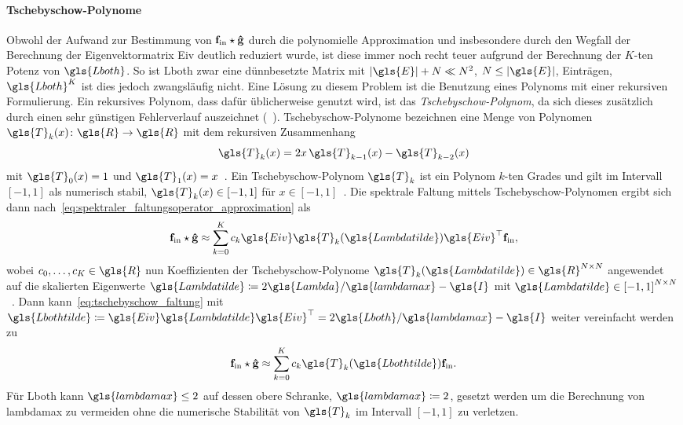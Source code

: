 \paragraph{Tschebyschow-Polynome}
\label{tschebyschow_polynome}

Obwohl der Aufwand zur Bestimmung von $\mathbf{f}_{\mathrm{in}} \star \mathbf{\hat g}$ durch die polynomielle Approximation und insbesondere durch den Wegfall der Berechnung der Eigenvektormatrix \gls{Eiv} deutlich reduziert wurde, ist diese immer noch recht teuer aufgrund der Berechnung der $K$-ten Potenz von $\gls{Lboth}$.
So ist \gls{Lboth} zwar eine dünnbesetzte Matrix mit $\left|\gls{E}\right| + N \ll N^2$, $N \leq \left|\gls{E}\right|$, Einträgen, $\gls{Lboth}^K$ ist dies jedoch zwangsläufig nicht.
Eine Lösung zu diesem Problem ist die Benutzung eines Polynoms mit einer rekursiven Formulierung.
Ein rekursives Polynom, dass dafür üblicherweise genutzt wird, ist das \emph{Tschebyschow-Polynom}, da sich dieses zusätzlich durch einen sehr günstigen Fehlerverlauf auszeichnet (\vgl{}~\cite{Hammond}).
Tschebyschow-Polynome bezeichnen eine Menge von Polynomen $\gls{T}_k\left(x\right) \colon \gls{R} \to \gls{R}$ mit dem rekursiven Zusammenhang
\begin{equation*}
  \gls{T}_k\left(x\right) = 2x\, \gls{T}_{k-1}\left(x\right) - \gls{T}_{k-2}\left(x\right)
\end{equation*}
mit $\gls{T}_0\left(x\right) = 1$ und $\gls{T}_1\left(x\right) = x$~\cite{Hammond}.
Ein Tschebyschow-Polynom $\gls{T}_k$ ist ein Polynom $k$-ten Grades und gilt im Intervall $\left[-1, 1\right]$ als numerisch stabil, \dhe{} $\gls{T}_k\left(x\right) \in \left[-1, 1\right]$ für $x \in \left[-1, 1\right]$~\cite{Hammond}.
Die spektrale Faltung mittels Tschebyschow-Polynomen ergibt sich dann nach~\eqref{eq:spektraler_faltungsoperator_approximation} als
\begin{equation}
  \ve{f}_{\mathrm{in}} \star \ve{\hat g} \approx \sum_{k=0}^K c_k\gls{Eiv}\gls{T}_k\left(\gls{Lambdatilde}\right)\gls{Eiv}^{\top}\ve{f}_{\mathrm{in}},
  \label{eq:tschebyschow_faltung}
\end{equation}
wobei $c_0, \ldots, c_K \in \gls{R}$ nun Koeffizienten der Tschebyschow-Polynome $\gls{T}_k\left(\gls{Lambdatilde}\right) \in \gls{R}^{N \times N}$ angewendet auf die skalierten Eigenwerte $\gls{Lambdatilde} \coloneqq 2\gls{Lambda}/\gls{lambdamax} - \gls{I}$ mit $\gls{Lambdatilde} \in {\left[-1, 1\right]}^{N \times N}$~\cite{Defferrard}.
Dann kann~\eqref{eq:tschebyschow_faltung} mit $\gls{Lbothtilde} \coloneqq \gls{Eiv}\gls{Lambdatilde}\gls{Eiv}^{\top} = 2\gls{Lboth}/\gls{lambdamax} - \gls{I}$ weiter vereinfacht werden zu~\cite{Defferrard}
\begin{equation}
  \ve{f}_{\mathrm{in}} \star \ve{\hat g} \approx \sum_{k=0}^K c_k\gls{T}_k\left(\gls{Lbothtilde}\right)\ve{f}_{\mathrm{in}}.
  \label{eq:tschebyschow_faltung_L}
\end{equation}
Für \gls{Lboth} kann $\gls{lambdamax} \leq 2$ auf dessen obere Schranke, \dhe{} $\gls{lambdamax} \coloneqq 2$, gesetzt werden um die Berechnung von \gls{lambdamax} zu vermeiden ohne die numerische Stabilität von $\gls{T}_k$ im Intervall $\left[-1, 1\right]$ zu verletzen.

